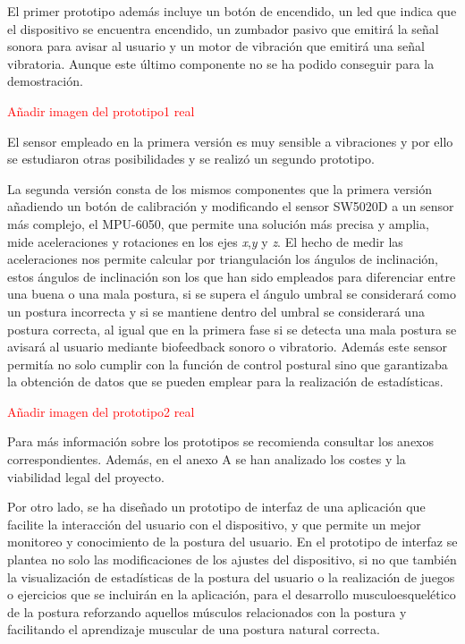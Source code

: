 El primer prototipo además incluye un botón de encendido, un led que indica que el dispositivo se encuentra encendido, un zumbador pasivo que emitirá la señal sonora para avisar al usuario y un motor de vibración que emitirá una señal vibratoria. Aunque este último componente no se ha podido conseguir para la demostración.

\textcolor{red}{Añadir imagen del prototipo1 real}

El sensor empleado en la primera versión es muy sensible a vibraciones y por ello se estudiaron otras posibilidades y se realizó un segundo prototipo.

La segunda versión consta de los mismos componentes que la primera versión añadiendo un botón de calibración y modificando el sensor SW5020D a un sensor más complejo, el MPU-6050, que permite una solución más precisa y amplia, mide aceleraciones y rotaciones en los ejes \textit{x},\textit{y} y \textit{z}. El hecho de medir las aceleraciones nos permite calcular por triangulación los ángulos de inclinación, estos ángulos de inclinación son los que han sido empleados para diferenciar entre una buena o una mala postura, si se supera el ángulo umbral se considerará como un postura incorrecta y si se mantiene dentro del umbral se considerará una postura correcta, al igual que en la primera fase si se detecta una mala postura se avisará al usuario mediante biofeedback sonoro o vibratorio. Además este sensor permitía no solo cumplir con la función de control postural sino que garantizaba la obtención de datos que se pueden emplear para la realización de estadísticas.

\textcolor{red}{Añadir imagen del prototipo2 real}

Para más información sobre los prototipos se recomienda consultar los anexos correspondientes. Además, en el anexo A se han analizado los costes y la viabilidad legal del proyecto.

Por otro lado, se ha diseñado un prototipo de interfaz de una aplicación que facilite la interacción del usuario con el dispositivo, y que permite un mejor monitoreo y conocimiento de la postura del usuario. En el prototipo de interfaz se plantea no solo las modificaciones de los ajustes del dispositivo, si no que también la visualización de estadísticas de la postura del usuario o la realización de juegos o ejercicios que se incluirán en la aplicación, para el desarrollo musculoesquelético de la postura reforzando aquellos músculos relacionados con la postura y facilitando el aprendizaje muscular de una postura natural correcta.

